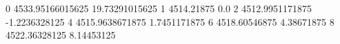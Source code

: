 0 4533.95166015625 19.73291015625
1 4514.21875 0.0
2 4512.9951171875 -1.2236328125
4 4515.9638671875 1.7451171875
6 4518.60546875 4.38671875
8 4522.36328125 8.14453125
